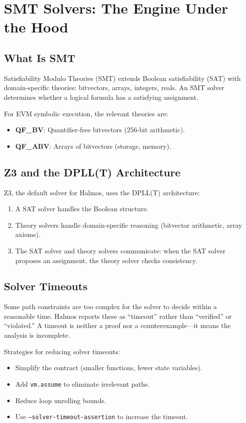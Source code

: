 \section{SMT Solvers: The Engine Under the Hood}


\subsection{What Is SMT}

Satisfiability Modulo Theories (SMT) extends Boolean satisfiability (SAT) with
domain-specific theories: bitvectors, arrays, integers, reals. An SMT solver determines
whether a logical formula has a satisfying assignment.

For EVM symbolic execution, the relevant theories are:
\begin{itemize}[nosep]
  \item \textbf{QF\_BV}: Quantifier-free bitvectors (256-bit arithmetic).
  \item \textbf{QF\_ABV}: Arrays of bitvectors (storage, memory).
\end{itemize}

\subsection{Z3 and the DPLL(T) Architecture}

Z3, the default solver for Halmos, uses the DPLL(T) architecture:
\begin{enumerate}[nosep]
  \item A SAT solver handles the Boolean structure.
  \item Theory solvers handle domain-specific reasoning (bitvector arithmetic, array axioms).
  \item The SAT solver and theory solvers communicate: when the SAT solver proposes an
    assignment, the theory solver checks consistency.
\end{enumerate}

\subsection{Solver Timeouts}

Some path constraints are too complex for the solver to decide within a reasonable time.
Halmos reports these as ``timeout'' rather than ``verified'' or ``violated.'' A timeout
is neither a proof nor a counterexample---it means the analysis is incomplete.

Strategies for reducing solver timeouts:
\begin{itemize}[nosep]
  \item Simplify the contract (smaller functions, fewer state variables).
  \item Add \texttt{vm.assume} to eliminate irrelevant paths.
  \item Reduce loop unrolling bounds.
  \item Use \texttt{--solver-timeout-assertion} to increase the timeout.
\end{itemize}

